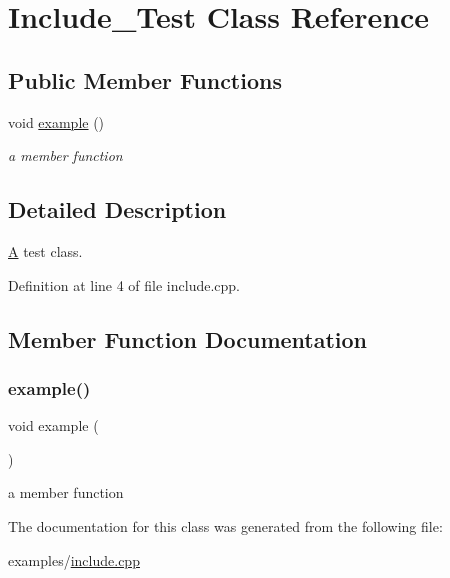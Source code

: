 \hypertarget{class_include___test}{}\section{Include\+\_\+\+Test Class Reference}
\label{class_include___test}
\subsection*{Public Member Functions}
\begin{DoxyCompactItemize}
\item 
void \hyperlink{class_include___test_afa2b50f4716fc3b42221a72e676e1422}{example} ()
\begin{DoxyCompactList}\small\item\em a member function \end{DoxyCompactList}\end{DoxyCompactItemize}


\subsection{Detailed Description}
\hyperlink{class_a}{A} test class. 

Definition at line 4 of file include.\+cpp.



\subsection{Member Function Documentation}
\mbox{\label{class_include___test_afa2b50f4716fc3b42221a72e676e1422}} 
\subsubsection{\texorpdfstring{example()}{example()}}
{\footnotesize\ttfamily void example (\begin{DoxyParamCaption}{ }\end{DoxyParamCaption})}



a member function 



The documentation for this class was generated from the following file\+:\begin{DoxyCompactItemize}
\item 
examples/\hyperlink{include_8cpp}{include.\+cpp}\end{DoxyCompactItemize}
